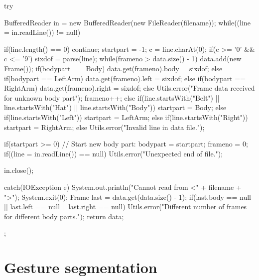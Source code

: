 \documentclass[12pt,a4,notitlepage]{report}
\renewcommand{\_}{\texttt{\symbol{95}}}
\newcommand{\<}{\texttt{\symbol{60}}}
\renewcommand{\>}{\texttt{\symbol{62}}}
\begin{document}
\begin{code}
{{      try
      {
         BufferedReader in = new BufferedReader(new FileReader(filename));
         while((line = in.readLine()) != null)
         {
            if(line.length() == 0)
               continue;
            startpart = -1;
            c = line.charAt(0);
            if(c >= '0' && c <= '9')
            {
               sixdof = parse(line);
               while(frameno > data.size() - 1)
                  data.add(new Frame());
               if(bodypart == Body)
                  data.get(frameno).body = sixdof;
               else if(bodypart == LeftArm)
                  data.get(frameno).left = sixdof;
               else if(bodypart == RightArm)
                  data.get(frameno).right = sixdof;
               else
                  Utils.error("Frame data received for unknown body part");
               frameno++;
            }
            else if(line.startsWith("Belt") || line.startsWith("Hat") ||
                  line.startsWith("Body"))
               startpart = Body;
            else if(line.startsWith("Left"))
               startpart = LeftArm;
            else if(line.startsWith("Right"))
               startpart = RightArm;
            else
               Utils.error("Invalid line in data file.");
            
            if(startpart >= 0)
            {
               // Start new body part:
               bodypart = startpart;
               frameno = 0;
               if((line = in.readLine()) == null)
                  Utils.error("Unexpected end of file.");
            }
         }
         in.close();
      }
      catch(IOException e)
      {
         System.out.println("Cannot read from <" + filename + ">");
         System.exit(0);
      }
      Frame last = data.get(data.size() - 1);
      if(last.body == null || last.left == null || last.right == null)
         Utils.error("Different number of frames for different body parts.");
      return data;
   }
};
\end{code}

\chapter{Gesture segmentation}
\end{document}
